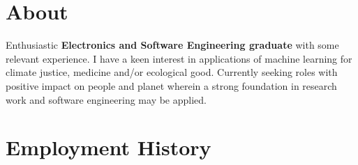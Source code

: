 \documentclass[]{cv-style}     %
\begin{document}
\section{About}
  \vspace{-0.4cm}

Enthusiastic \textbf{Electronics and Software Engineering graduate} with some relevant experience. I have a keen interest in applications of machine learning for climate justice, medicine and/or ecological good. Currently seeking roles with positive impact on people and planet wherein a strong foundation in research work and software engineering may be applied.
  \vspace{-0.2cm}
\section{Employment History}
  \vspace{-0.4cm}
  
\end{document}
